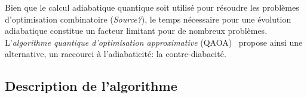 Bien que le calcul adiabatique quantique soit utilisé pour résoudre les problèmes d'optimisation combinatoire (\textcolor{mydarkred}{\textit{Source?}}), le temps nécessaire pour une évolution adiabatique constitue un facteur limitant pour de nombreux problèmes. L'\textit{algorithme quantique d'optimisation approximative} (QAOA)~\cite{farhiQuantumApproximateOptimization2014} propose ainsi une alternative, un raccourci à l'adiabaticité: la contre-diabacité.


\subsection{Description de l'algorithme}
\label{subsec:description-algorithme}

